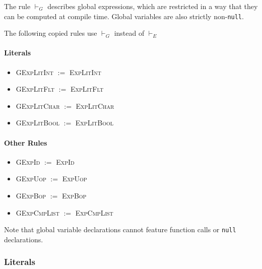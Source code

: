 \documentclass{article}
\newcommand{\code}[1]{\lstinline[columns=fixed]{#1}}
\newcommand{\subsubsubsection}{\paragraph}
\begin{document}
				The rule $\vdash_G$ describes global expressions, which are restricted in a way that they can be computed at compile time. Global variables are also strictly non-\code{null}.
				
				The following copied rules use $\vdash_G$ instead of $\vdash_E$
				
				\subsubsubsection{Literals}
				
					\begin{itemize}
						\item \textsc{GExpLitInt} $:=$ \textsc{ExpLitInt}
						\item \textsc{GExpLitFlt} $:=$ \textsc{ExpLitFlt}
						\item \textsc{GExpLitChar} $:=$ \textsc{ExpLitChar}
						\item \textsc{GExpLitBool} $:=$ \textsc{ExpLitBool}
					\end{itemize}
				
				\subsubsubsection{Other Rules}
				
					\begin{itemize}
						\item \textsc{GExpId} $:=$ \textsc{ExpId}
						\item \textsc{GExpUop} $:=$ \textsc{ExpUop}
						\item \textsc{GExpBop} $:=$ \textsc{ExpBop}
						\item \textsc{GExpCmpList} $:=$ \textsc{ExpCmpList}
					\end{itemize}
				
					Note that global variable declarations cannot feature function calls or \code{null} declarations.
		
			\subsubsection{Literals}
			
\end{document}
